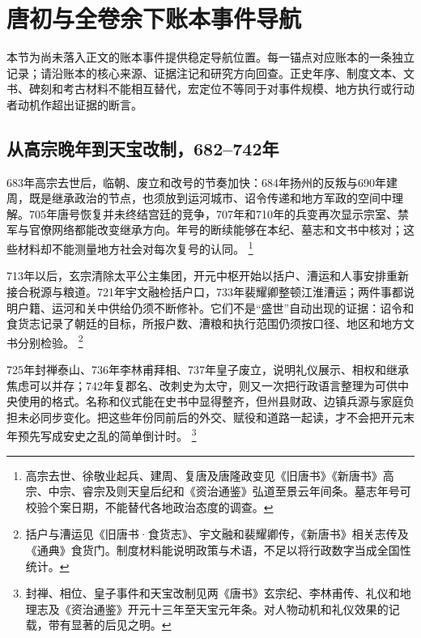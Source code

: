 \section{唐初与全卷余下账本事件导航}
\label{sec:event-anchors-final-1}
本节为尚未落入正文的账本事件提供稳定导航位置。每一锚点对应账本的一条独立记录；请沿账本的核心来源、证据注记和研究方向回查。正史年序、制度文本、文书、碑刻和考古材料不能相互替代，宏定位不等同于对事件规模、地方执行或行动者动机作超出证据的断言。

\subsection{从高宗晚年到天宝改制，682--742年}

683年高宗去世后，临朝、废立和改号的节奏加快：684年扬州的反叛与690年建周，既是继承政治的节点，也须放到运河城市、诏令传递和地方军政的空间中理解。705年唐号恢复并未终结宫廷的竞争，707年和710年的兵变再次显示宗室、禁军与官僚网络都能改变继承方向。年号的断续能够在本纪、墓志和文书中核对；这些材料却不能测量地方社会对每次复号的认同。%
\footnote{高宗去世、徐敬业起兵、建周、复唐及唐隆政变见《旧唐书》《新唐书》高宗、中宗、睿宗及则天皇后纪和《资治通鉴》弘道至景云年间条。墓志年号可校验个案日期，不能替代各地政治态度的调查。}

713年以后，玄宗清除太平公主集团，开元中枢开始以括户、漕运和人事安排重新接合税源与粮道。721年宇文融检括户口，733年裴耀卿整顿江淮漕运；两件事都说明户籍、运河和关中供给仍须不断修补。它们不是“盛世”自动出现的证据：诏令和食货志记录了朝廷的目标，所报户数、漕粮和执行范围仍须按口径、地区和地方文书分别检验。%
\footnote{括户与漕运见《旧唐书·食货志》、宇文融和裴耀卿传，《新唐书》相关志传及《通典》食货门。制度材料能说明政策与术语，不足以将行政数字当成全国性统计。}

725年封禅泰山、736年李林甫拜相、737年皇子废立，说明礼仪展示、相权和继承焦虑可以并存；742年复郡名、改刺史为太守，则又一次把行政语言整理为可供中央使用的格式。名称和仪式能在史书中显得整齐，但州县财政、边镇兵源与家庭负担未必同步变化。把这些年份同前后的外交、赋役和道路一起读，才不会把开元末年预先写成安史之乱的简单倒计时。%
\footnote{封禅、相位、皇子事件和天宝改制见两《唐书》玄宗纪、李林甫传、礼仪和地理志及《资治通鉴》开元十三年至天宝元年条。对人物动机和礼仪效果的记载，带有显著的后见之明。}

